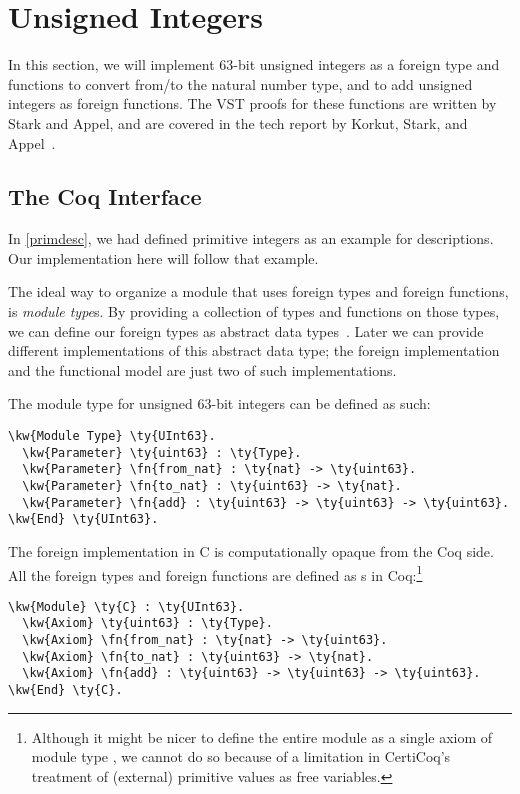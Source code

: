 \section{Unsigned Integers}
\label{integers}

In this section, we will implement 63-bit unsigned integers as a \gls{foreign type} and functions to convert from/to the natural number type, and to add unsigned integers as \gls{foreign function}s. The VST proofs for these functions are written by Stark and Appel, and are covered in the tech report by Korkut, Stark, and Appel~\cite{korkutStarkAppel}.

\subsection{The Coq Interface}

In \autoref{primdesc}, we had defined primitive integers as an example for \reified{} descriptions. Our implementation here will follow that example.

The ideal way to organize a module that uses \gls{foreign type}s and \gls{foreign function}s, is \emph{module type}s. By providing a collection of types and functions on those types, we can define our \gls{foreign type}s as abstract data types~\cite{liskov1974abstract}. Later we can provide different implementations of this abstract data type; the foreign implementation and the \gls{functional model} are just two of such implementations.

The module type for unsigned 63-bit integers can be defined as such:
\begin{Verbatim}
\kw{Module Type} \ty{UInt63}.
  \kw{Parameter} \ty{uint63} : \ty{Type}.
  \kw{Parameter} \fn{from_nat} : \ty{nat} -> \ty{uint63}.
  \kw{Parameter} \fn{to_nat} : \ty{uint63} -> \ty{nat}.
  \kw{Parameter} \fn{add} : \ty{uint63} -> \ty{uint63} -> \ty{uint63}.
\kw{End} \ty{UInt63}.
\end{Verbatim}

The foreign implementation in C is computationally opaque from the Coq side. All the \gls{foreign type}s and \gls{foreign function}s are defined as s in Coq:\footnote{Although it might be nicer to define the entire  module as a single axiom of module type , we cannot do so because of a limitation in CertiCoq's treatment of (external) primitive values as free variables.}

\begin{Verbatim}
\kw{Module} \ty{C} : \ty{UInt63}.
  \kw{Axiom} \ty{uint63} : \ty{Type}.
  \kw{Axiom} \fn{from_nat} : \ty{nat} -> \ty{uint63}.
  \kw{Axiom} \fn{to_nat} : \ty{uint63} -> \ty{nat}.
  \kw{Axiom} \fn{add} : \ty{uint63} -> \ty{uint63} -> \ty{uint63}.
\kw{End} \ty{C}.
\end{Verbatim}

